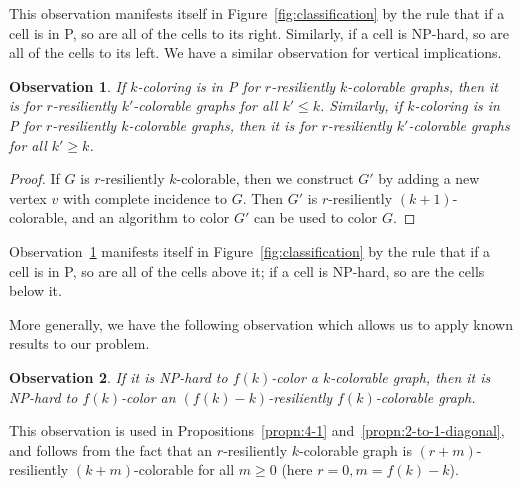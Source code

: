 \documentclass{article}[11pt]  %
\newtheorem{obs}{Observation}
\begin{document}
This observation manifests itself in Figure~\ref{fig:classification} by the rule
that if a cell is in P, so are all of the cells to its right. Similarly, if a
cell is NP-hard, so are all of the cells to its left. We have a similar
observation for vertical implications. 

\begin{obs}\label{obs:vertical}
If $k$-coloring is in P for $r$-resiliently $k$-colorable graphs, then
it is for $r$-resiliently $k'$-colorable graphs for all $k' \leq k$.  Similarly,
if $k$-coloring is in P for $r$-resiliently $k$-colorable graphs, then
it is for $r$-resiliently $k'$-colorable graphs for all $k' \geq
k$.
\end{obs}
\begin{proof}
If $G$ is $r$-resiliently $k$-colorable, then we construct $G'$ by adding a
new vertex $v$ with complete incidence to $G$. Then $G'$ is $r$-resiliently
$(k+1)$-colorable, and an algorithm to color $G'$ can be used to color $G$.
\end{proof}

Observation~\ref{obs:vertical} manifests itself in
Figure~\ref{fig:classification} by the rule that if a cell is in P, so are all
of the cells above it; if a cell is NP-hard, so are the cells below it.

More generally, we have the following observation which allows us to apply known
results to our problem.

\begin{obs}\label{obs:function-bound}
If it is NP-hard to $f(k)$-color a $k$-colorable graph, then it is NP-hard to
$f(k)$-color an $(f(k)-k)$-resiliently $f(k)$-colorable graph.
\end{obs}

This observation is used in Propositions~\ref{propn:4-1}
and~\ref{propn:2-to-1-diagonal}, and follows from the fact that an
$r$-resiliently $k$-colorable graph is $(r+m)$-resiliently $(k+m)$-colorable
for all $m \geq 0$ (here $r = 0, m = f(k) - k$). 
\end{document}

